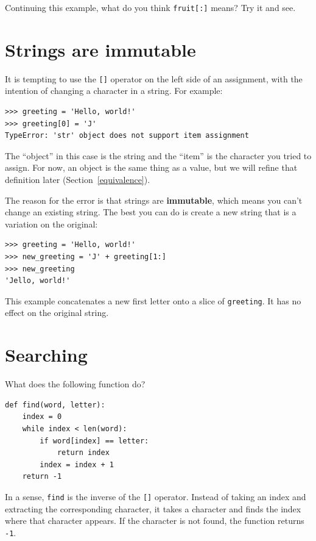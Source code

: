\documentclass[10pt]{book}
\begin{document}
Continuing this example, what do you think
{\tt fruit[:]} means?  Try it and see.



\section{Strings are immutable}

It is tempting to use the {\tt []} operator on the left side of an
assignment, with the intention of changing a character in a string.
For example:

\begin{verbatim}
>>> greeting = 'Hello, world!'
>>> greeting[0] = 'J'
TypeError: 'str' object does not support item assignment
\end{verbatim}
%
The ``object'' in this case is the string and the ``item'' is
the character you tried to assign.  For now, an object is
the same thing as a value, but we will refine that definition
later (Section~\ref{equivalence}).

The reason for the error is that
strings are {\bf immutable}, which means you can't change an
existing string.  The best you can do is create a new string
that is a variation on the original:

\begin{verbatim}
>>> greeting = 'Hello, world!'
>>> new_greeting = 'J' + greeting[1:]
>>> new_greeting
'Jello, world!'
\end{verbatim}
%
This example concatenates a new first letter onto
a slice of {\tt greeting}.  It has no effect on
the original string.


\section{Searching}
\label{find}

What does the following function do?

\begin{verbatim}
def find(word, letter):
    index = 0
    while index < len(word):
        if word[index] == letter:
            return index
        index = index + 1
    return -1
\end{verbatim}
%
In a sense, {\tt find} is the inverse of the {\tt []} operator.
Instead of taking an index and extracting the corresponding character,
it takes a character and finds the index where that character
appears.  If the character is not found, the function returns {\tt
-1}.
\end{document}
